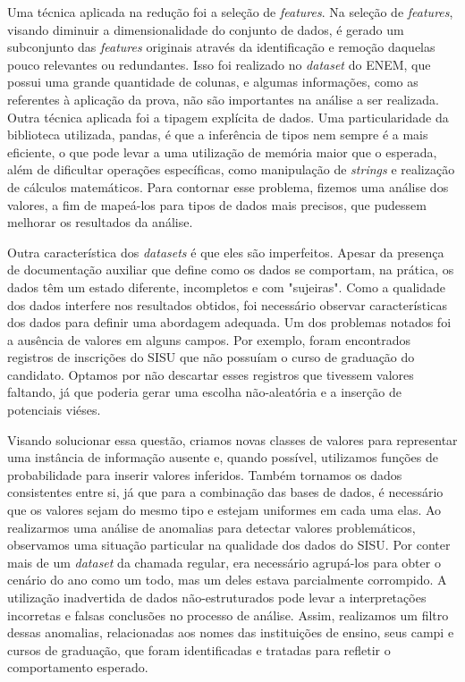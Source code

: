 Uma técnica aplicada na redução foi a seleção de \textit{features}. Na seleção de \textit{features}, visando diminuir a dimensionalidade
 do conjunto de dados, é gerado um subconjunto das \textit{features} originais através da identificação e remoção daquelas pouco relevantes
ou redundantes. Isso foi realizado no \textit{dataset} do ENEM, que possui uma grande quantidade de colunas, e algumas informações, 
como as referentes à aplicação da prova, não são importantes na análise a ser realizada. 
Outra técnica aplicada foi a tipagem explícita de dados. Uma particularidade da biblioteca utilizada, pandas, é que a inferência de tipos 
nem sempre é a mais eficiente, o que pode levar a uma utilização de memória maior que o esperada, além de dificultar operações específicas, 
como manipulação de \textit{strings} e realização de cálculos matemáticos. Para contornar esse problema, fizemos uma análise dos valores, a fim de mapeá-los
para tipos de dados mais precisos, que pudessem melhorar os resultados da análise.

Outra característica dos \textit{datasets} é que eles são imperfeitos. Apesar da presença de documentação auxiliar que define como os dados se comportam, na prática, os dados têm um estado diferente, incompletos e com "sujeiras". Como a qualidade dos dados interfere nos resultados obtidos, foi necessário observar características dos dados para definir uma abordagem adequada.
Um dos problemas notados foi a ausência de valores em alguns campos. Por exemplo, foram encontrados registros de inscrições do SISU que não possuíam o curso de graduação do candidato. Optamos por não descartar esses registros que tivessem valores faltando, já que poderia gerar uma escolha não-aleatória e a inserção de potenciais viéses. 

Visando solucionar essa questão, criamos novas classes de valores para representar uma instância de informação ausente e, quando possível, utilizamos funções de probabilidade para inserir valores inferidos. Também tornamos os dados consistentes entre si, já que para a combinação das bases de dados, é necessário que os valores sejam do mesmo tipo e estejam uniformes em cada uma elas. Ao realizarmos uma análise de anomalias para detectar valores problemáticos, observamos uma situação particular na qualidade dos dados do SISU. Por conter mais de um \textit{dataset} da chamada regular, era necessário agrupá-los para obter o cenário do ano como um todo, mas um deles estava parcialmente corrompido. A utilização inadvertida de dados não-estruturados pode levar a interpretações incorretas e falsas conclusões no processo de análise. Assim, realizamos um filtro dessas anomalias, relacionadas aos nomes das instituições de ensino, seus campi e cursos de graduação, que foram identificadas e tratadas para refletir o comportamento esperado. 

